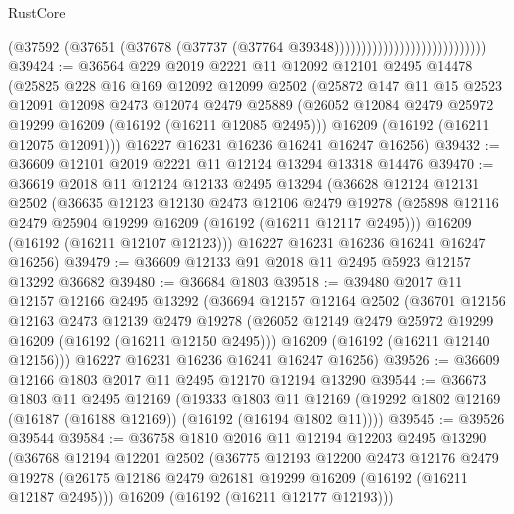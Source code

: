 \begin{lexlean}{RustCore}
\begin{coremodule}
                                                  (@37592
                                                    (@37651
                                                      (@37678
                                                        (@37737
                                                          (@37764 @39348))))))))))))))))))))))))))))
@39424 := @36564
    @229
    @2019
    @2221
    @11
    @12092
    @12101
    @2495
    @14478
    (@25825
      @228
      @16
      @169
      @12092
      @12099
      @2502
      (@25872
        @147
        @11
        @15
        @2523
        @12091
        @12098
        @2473
        @12074
        @2479
        @25889
        (@26052 @12084 @2479 @25972 @19299 @16209 (@16192 (@16211 @12085 @2495)))
        @16209
        (@16192 (@16211 @12075 @12091)))
      @16227
      @16231
      @16236
      @16241
      @16247
      @16256)
@39432 := @36609 @12101 @2019 @2221 @11 @12124 @13294 @13318 @14476
@39470 := @36619
    @2018
    @11
    @12124
    @12133
    @2495
    @13294
    (@36628
      @12124
      @12131
      @2502
      (@36635
        @12123
        @12130
        @2473
        @12106
        @2479
        @19278
        (@25898 @12116 @2479 @25904 @19299 @16209 (@16192 (@16211 @12117 @2495)))
        @16209
        (@16192 (@16211 @12107 @12123)))
      @16227
      @16231
      @16236
      @16241
      @16247
      @16256)
@39479 := @36609 @12133 @91 @2018 @11 @2495 @5923 @12157 @13292 @36682
@39480 := @36684 @1803
@39518 := @39480
    @2017
    @11
    @12157
    @12166
    @2495
    @13292
    (@36694
      @12157
      @12164
      @2502
      (@36701
        @12156
        @12163
        @2473
        @12139
        @2479
        @19278
        (@26052 @12149 @2479 @25972 @19299 @16209 (@16192 (@16211 @12150 @2495)))
        @16209
        (@16192 (@16211 @12140 @12156)))
      @16227
      @16231
      @16236
      @16241
      @16247
      @16256)
@39526 := @36609 @12166 @1803 @2017 @11 @2495 @12170 @12194 @13290
@39544 := @36673
    @1803
    @11
    @2495
    @12169
    (@19333
      @1803
      @11
      @12169
      (@19292 @1802 @12169 (@16187 (@16188 @12169)) (@16192 (@16194 @1802 @11))))
@39545 := @39526 @39544
@39584 := @36758
    @1810
    @2016
    @11
    @12194
    @12203
    @2495
    @13290
    (@36768
      @12194
      @12201
      @2502
      (@36775
        @12193
        @12200
        @2473
        @12176
        @2479
        @19278
        (@26175 @12186 @2479 @26181 @19299 @16209 (@16192 (@16211 @12187 @2495)))
        @16209
        (@16192 (@16211 @12177 @12193)))

\end{coremodule}
\end{lexlean}
